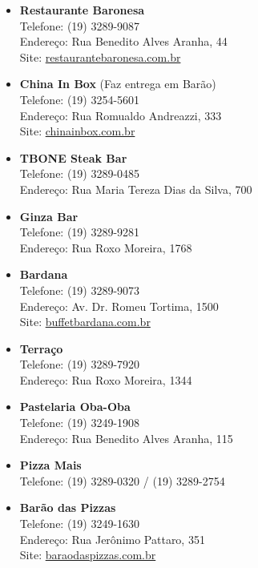 \begin{itemize}
    \item   \textbf{Restaurante Baronesa}
        \\Telefone: (19) 3289-9087
        \\Endereço: Rua Benedito Alves Aranha, 44
        \\Site: \url{restaurantebaronesa.com.br}

    \item   \textbf{China In Box} (Faz entrega em Barão)
        \\Telefone: (19) 3254-5601
        \\Endereço: Rua Romualdo Andreazzi, 333
        \\Site: \url{chinainbox.com.br}

    \item   \textbf{TBONE Steak Bar}
        \\Telefone: (19) 3289-0485
        \\Endereço: Rua Maria Tereza Dias da Silva, 700

    \item   \textbf{Ginza Bar}
        \\Telefone: (19) 3289-9281
        \\Endereço: Rua Roxo Moreira, 1768

    \item   \textbf{Bardana}
        \\Telefone: (19) 3289-9073
        \\Endereço: Av. Dr. Romeu Tortima, 1500
        \\Site: \url{buffetbardana.com.br}

    \item   \textbf{Terraço}
        \\Telefone: (19) 3289-7920
        \\Endereço: Rua Roxo Moreira, 1344

    \item   \textbf{Pastelaria Oba-Oba}
        \\Telefone: (19) 3249-1908
        \\Endereço: Rua Benedito Alves Aranha, 115

    \item   \textbf{Pizza Mais}
        \\Telefone: (19) 3289-0320 / (19) 3289-2754

    \item   \textbf{Barão das Pizzas}
        \\Telefone: (19) 3249-1630
        \\Endereço: Rua Jerônimo Pattaro, 351
        \\Site: \url{baraodaspizzas.com.br}


\end{itemize}
